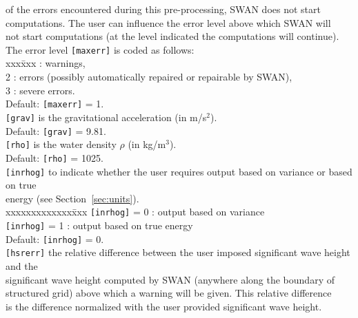 \documentclass[12pt]{book}
\begin{document}
\begin{tabbing}
                   of the errors encountered during this pre-processing, SWAN does not start\\
                   computations. The user can influence the error level above which SWAN will\\
                   not start computations (at the level indicated the computations will continue).\\
                   The error level {\tt [maxerr]} is coded as follows:\\
                   \pushtabs
                   xxx\=xxx  \>: warnings,\\
                   2 \>: errors (possibly automatically repaired or repairable by SWAN),\\
                   3 \>: severe errors.\\
                   \poptabs
                   Default: {\tt [maxerr]} = 1.\-\\
{\tt [grav]}    \> is the gravitational acceleration (in m/s$^2$).\+\\
                   Default: {\tt [grav]} = 9.81.\-\\
{\tt [rho]}     \> is the water density $\rho$ (in kg/m$^3$).\+\\
                   Default: {\tt [rho]} = 1025.\-\\
{\tt [inrhog]}  \> to indicate whether the user requires output based on variance or based on true\+\\
                   energy (see Section~\ref{sec:units}).\\
                   \pushtabs
                   xxxxxxxxxxxxx\=xxx \kill
                   {\tt [inrhog]} = 0 \>: output based on variance\\
                   {\tt [inrhog]} = 1 \>: output based on true energy\\
                   \poptabs
                   Default: {\tt [inrhog]} = 0.\-\\
{\tt [hsrerr]}  \> the relative difference between the user imposed significant wave height and the\+\\
                   significant wave height computed by SWAN (anywhere along the boundary of\\
                   structured grid) above which a warning will be given. This relative difference\\
                   is the difference normalized with the user provided significant wave height.\\

\end{tabbing}
\end{document}
